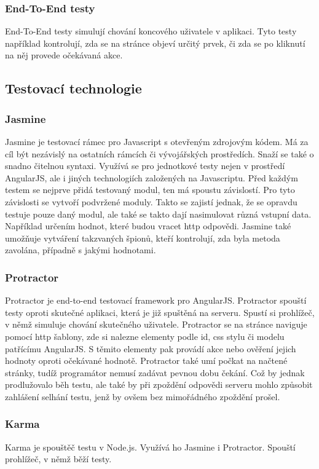 \documentclass[czech,master,public,dept460,male,cpdeclaration,twoside]{diploma}
\begin{document}
\subsubsection{End-To-End testy}
End-To-End testy simulují chování koncového uživatele v aplikaci. Tyto testy například kontrolují, zda se na stránce objeví určitý prvek, či zda se po kliknutí na něj provede očekávaná akce.

\subsection{Testovací technologie}
\subsubsection{Jasmine}
Jasmine je testovací rámec pro Javascript s otevřeným zdrojovým kódem. Má za cíl být nezávislý na ostatních rámcích či vývojářských prostředích. Snaží se také o snadno čitelnou syntaxi. Využívá se pro jednotkové testy nejen v prostředí AngularJS, ale i jiných technologiích založených na Javascriptu. Před každým testem se nejprve přidá testovaný modul, ten má spoustu závislostí. Pro tyto závislosti se vytvoří podvržené moduly. Takto se zajistí jednak, že se opravdu testuje pouze daný modul, ale také se takto dají nasimulovat různá vstupní data. Například určením hodnot, které budou vracet http odpovědi. Jasmine také umožňuje vytváření takzvaných špionů, kteří kontrolují, zda byla metoda zavolána, případně s jakými hodnotami.

\subsubsection{Protractor}
Protractor je end-to-end testovací framework pro AngularJS. Protractor spouští testy oproti skutečné aplikaci, která je již spuštěná na serveru. Spustí si prohlížeč, v němž simuluje chování skutečného uživatele. Protractor se na stránce naviguje pomocí http šablony, zde si nalezne elementy podle id, css stylu či modelu patřícímu AngularJS. S těmito elementy pak provádí akce nebo ověření jejich hodnoty oproti očekávané hodnotě. Protractor také umí počkat na načtené stránky, tudíž programátor nemusí zadávat pevnou dobu čekání. Což by jednak prodlužovalo běh testu, ale také by při zpoždění odpovědi serveru mohlo způsobit zahlášení selhání testu, jenž by ovšem bez mimořádného zpoždění prošel. \cite{TestingAngularApp}

\subsubsection{Karma}
Karma je spouštěč testu v Node.js. Využívá ho Jasmine i Protractor. Spouští prohlížeč, v němž běží testy.
\end{document}
